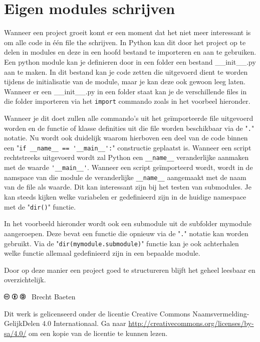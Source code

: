 \documentclass[11pt,twoside]{article}
\begin{document}
 	\section{Eigen modules schrijven}
Wanneer een project groeit komt er een moment dat het niet meer interessant is om alle code in één file the schrijven. In Python kan dit door het project op te delen in modules en deze in een hoofd bestand te importeren en aan te gebruiken. Een python module kan je definieren door in een folder een bestand \textsf{\_\_init\_\_.py} aan te maken. In dit bestand kan je code zetten die uitgevoerd dient te worden tijdens de initialisatie van de module, maar je kan deze ook gewoon leeg laten. Wanneer er een \textsf{\_\_init\_\_.py} in een folder staat kan je de verschillende files in die folder importeren via het \lstinline{import} commando zoals in het voorbeel hieronder.

Wanneer je dit doet zullen alle commando's uit het geïmporteerde file uitgevoerd worden en de functie of klasse definities uit die file worden beschikbaar via de "\lstinline{.}" notatie. Nu wordt ook duidelijk waarom hierboven een deel van de code binnen een "\lstinline{if __name__ == '__main__':}" constructie geplaatst is. Wanneer een script rechtstreeks uitgevoerd wordt zal Python een \lstinline{__name__} veranderlijke aanmaken met de waarde \lstinline{'__main__'}. Wanneer een script geïmporteerd wordt, wordt in de namspace van die module de veranderlijke \lstinline{__name__} aangemaakt met de naam van de file als waarde. Dit kan interessant zijn bij het testen van submodules. Je kan steeds kijken welke variabelen er gedefinieerd zijn in de huidige namespace met de "\lstinline{dir()}" functie.

In het voorbeeld hieronder wordt ook een submodule uit de subfolder \textsf{mymodule} aangeroepen. Deze bevat een functie die opnieuw via de "\lstinline{.}" notatie kan worden gebruikt. Via de "\lstinline{dir(mymodule.submodule)}" functie kan je ook achterhalen welke functie allemaal gedefinieerd zijn in een bepaalde module.

Door op deze manier een project goed te structureren blijft het geheel leesbaar en overzichtelijk.
	

\null
\vfill
\includegraphics[height=0.3cm]{fig/cc}
\includegraphics[height=0.3cm]{fig/by}
\includegraphics[height=0.3cm]{fig/sa}
\quad \the\year\ Brecht Baeten
\vspace{0.5cm}

Dit werk is gelicenseerd onder de licentie Creative Commons Naamsvermelding-GelijkDelen 4.0 Internationaal. Ga naar \url{http://creativecommons.org/licenses/by-sa/4.0/} om een kopie van de licentie te kunnen lezen.
\vspace{2cm}
\end{document}
